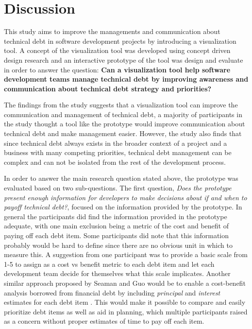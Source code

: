 

\section{Discussion}

This study aims to improve the managements and communication about technical debt in software development projects by introducing a visualization tool.
A concept of the visualization tool was developed using concept driven design research and an interactive prototype of the tool was design and evaluate in order to answer the question: 
\textbf{Can a visualization tool help software development teams manage technical debt by improving awareness and communication about technical debt strategy and priorities?}

The findings from the study suggests that a visualization tool can improve the communication and management of technical debt, a majority of participants in the study thought a tool like the prototype would improve communication about technical debt and make management easier.
However, the study also finds that since technical debt always exists in the broader context of a project and a business with many competing priorities, technical debt management can be complex and can not be isolated from the rest of the development process.

In order to answer the main research question stated above, the prototype was evaluated based on two sub-questions.
The first question, \textit{Does the prototype present enough information for developers to make decisions about if and when to payoff technical debt?}, focused on the information provided by the prototype.
In general the participants did find the information provided in the prototype adequate, with one main exclusion being a metric of the cost and benefit of paying off each debt item.
Some participants did note that this information probably would be hard to define since there are no obvious unit in which to measure this.
A suggestion from one participant was to provide a basic scale from 1-5 to assign as a cost vs benefit metric to each debt item and let each development team decide for themselves what this scale implicates.
Another similar approach proposed by Seaman and Guo would be to enable a cost-benefit analysis borrowed from financial debt by including \textit{principal} and \textit{interest} estimates for each debt item \cite{seaman_using_2012}.
This would make it possible to compare and easily prioritize debt items as well as aid in planning, which multiple participants raised as a concern without proper estimates of time to pay off each item.

